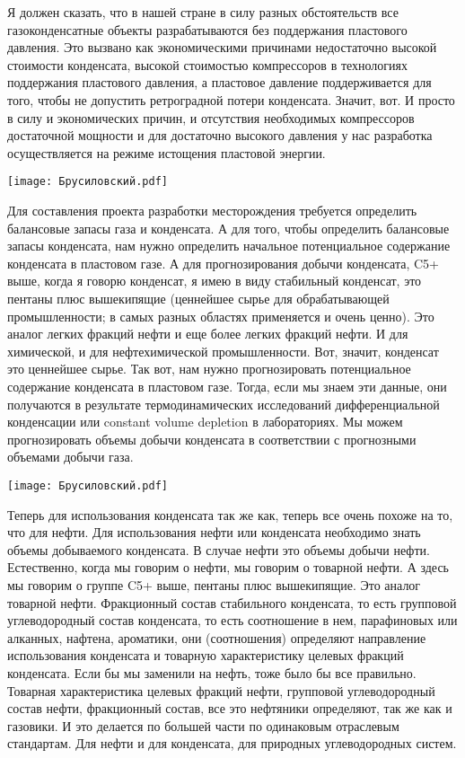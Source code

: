 \documentclass[main.tex]{subfiles}
\begin{document}
Я должен сказать, что в нашей стране в силу разных обстоятельств все газоконденсатные объекты разрабатываются без поддержания пластового давления.
Это вызвано как экономическими причинами недостаточно высокой стоимости конденсата, высокой стоимостью компрессоров в технологиях поддержания пластового давления, а пластовое давление поддерживается для того, чтобы не допустить ретроградной потери конденсата.
Значит, вот.
И просто в силу и экономических причин, и отсутствия необходимых компрессоров достаточной мощности и для достаточно высокого давления у нас разработка осуществляется на режиме истощения пластовой энергии.

\begin{center}
\texttt{[image: Брусиловский.pdf]}
\end{center}

Для составления проекта разработки месторождения требуется определить балансовые запасы газа и конденсата.
А для того, чтобы определить балансовые запасы конденсата, нам нужно определить начальное потенциальное содержание конденсата в пластовом газе.
А для прогнозирования добычи конденсата, C5+ выше, когда я говорю конденсат, я имею в виду стабильный конденсат, это пентаны плюс вышекипящие (ценнейшее сырье для обрабатывающей промышленности; в самых разных областях применяется и очень ценно).
Это аналог легких фракций нефти и еще более легких фракций нефти.
И для химической, и для нефтехимической промышленности.
Вот, значит, конденсат это ценнейшее сырье.
Так вот, нам нужно прогнозировать потенциальное содержание конденсата в пластовом газе.
Тогда, если мы знаем эти данные, они получаются в результате термодинамических исследований дифференциальной конденсации или constant volume depletion в лабораториях.
Мы можем прогнозировать объемы добычи конденсата в соответствии с прогнозными объемами добычи газа.

\begin{center}
\texttt{[image: Брусиловский.pdf]}
\end{center}

Теперь для использования конденсата так же как, теперь все очень похоже на то, что для нефти.
Для использования нефти или конденсата необходимо знать объемы добываемого конденсата.
В случае нефти это объемы добычи нефти.
Естественно, когда мы говорим о нефти, мы говорим о товарной нефти.
А здесь мы говорим о группе C5+ выше, пентаны плюс вышекипящие.
Это аналог товарной нефти.
Фракционный состав стабильного конденсата, то есть групповой углеводородный состав конденсата, то есть соотношение в нем, парафиновых или алканных, нафтена, ароматики, они (соотношения) определяют направление использования конденсата и товарную характеристику целевых фракций конденсата.
Если бы мы заменили на нефть, тоже было бы все правильно.
Товарная характеристика целевых фракций нефти, групповой углеводородный состав нефти, фракционный состав, все это нефтяники определяют, так же как и газовики.
И это делается по большей части по одинаковым отраслевым стандартам.
Для нефти и для конденсата, для природных углеводородных систем.
\end{document}
